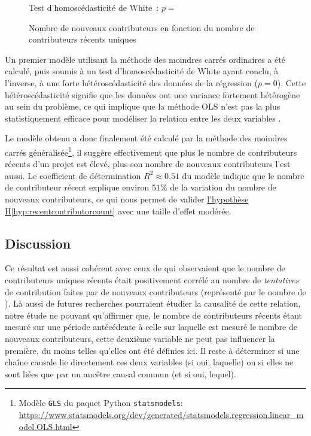 \begin{figure}
    

    Test d'homoscédasticité de White : $p = $

    \caption{Nombre de nouveaux contributeurs en fonction du nombre de contributeurs récents uniques}
    \label{fig:contributorCount}
\end{figure}

Un premier modèle utilisant la méthode des moindres carrés ordinaires a été calculé, puis soumis à un test
d'homoscédasticité de White ayant conclu, à l'inverse, à une forte hétéroscédasticité des données de la
régression ($p = 0$). Cette hétéroscédasticité signifie que les données ont une variance fortement hétérogène
au sein du problème, ce qui implique que la méthode OLS n'est pas la plus statistiquement efficace pour
modéliser la relation entre les deux variables \parencite{GLS-2021}.

Le modèle obtenu a donc finalement été calculé par la méthode des moindres carrés généralisée\footnote{Modèle
\texttt{GLS} du paquet Python \texttt{statsmodels}:
\url{https://www.statsmodels.org/dev/generated/statsmodels.regression.linear_model.OLS.html}}, il suggère
effectivement que plus le nombre de contributeurs récents d'un projet est élevé, plus son nombre de nouveaux
contributeurs l'est aussi. Le coefficient de détermination $R^2 \approx 0.51$ du modèle indique que le nombre
de contributeur récent explique environ $51\%$ de la variation du nombre de nouveaux contributeurs, ce qui
nous permet de valider \hyperref[hyp:recentcontributorcount]{l'hypothèse H\ref*{hyp:recentcontributorcount}}
avec une taille d'effet modérée.

\subsection{Discussion}

Ce résultat est aussi cohérent avec ceux de \textcite[p.~12-13,16]{signals-2019} qui observaient que le nombre
de contributeurs uniques récents était positivement corrélé au nombre de \emph{tentatives} de contribution
faites par de nouveaux contributeurs (représenté par le nombre de ). Là aussi de futures
recherches pourraient étudier la causalité de cette relation, notre étude ne pouvant qu'affirmer que, le
nombre de contributeurs récents étant mesuré sur une période antécédente à celle sur laquelle est mesuré le
nombre de nouveaux contributeurs, cette deuxième variable ne peut pas influencer la première, du moins telles
qu'elles ont été définies ici. Il reste à déterminer si une chaîne causale lie directement ces deux variables
(si oui, laquelle) ou si elles ne sont liées que par un ancêtre causal commun (et si oui, lequel).

